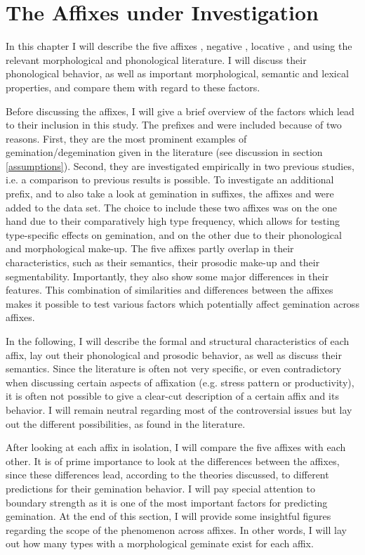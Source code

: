 
\chapter{The Affixes under Investigation}{\label{affixes}}


In this chapter I will describe the five affixes , negative , locative ,  and  using the relevant morphological and phonological literature. I will discuss their phonological behavior, as well as important morphological, semantic and lexical properties, and compare them with regard to these factors.

Before discussing the affixes, I will give a brief overview of the factors which lead to their inclusion in this study.
The prefixes  and  were included because of two reasons.
First, they are the most prominent examples of gemination/degemination given in the literature (see discussion in section \ref{assumptions}).  Second, they are investigated empirically in two previous studies, i.e. a comparison to previous results is possible. 
To investigate an additional prefix, and to also take a look at gemination in suffixes, the affixes  and   were added to the data set. The choice to include these two affixes was on the one hand due to their comparatively high type frequency, which allows for testing type-specific effects on gemination, and  on the other due to their phonological and morphological make-up.
The five affixes partly overlap in their characteristics, such as their semantics, their prosodic make-up and their segmentability. Importantly, they also show some major differences in their features. This combination of similarities and differences between the affixes makes it possible to test various factors which potentially affect gemination across affixes.

In the following, I will describe the formal and structural characteristics of each affix, lay out their phonological and prosodic behavior, as well as discuss their semantics. Since the literature is often not very specific, or even contradictory when discussing certain aspects of affixation (e.g. stress pattern or productivity), it is often not possible to give a clear-cut description of a certain affix and its behavior. I will remain neutral regarding most of the controversial issues but lay out the different possibilities, as found in the literature.  

After looking at each affix in isolation, I will compare the five affixes with each other. It is of prime importance to look at the differences between the affixes, since these differences lead, according to the theories discussed, to different predictions for their gemination behavior. I will pay special attention to boundary strength as it is one of the most important factors for predicting gemination.  
At the end of this section, I will provide some insightful figures regarding the scope of the phenomenon across affixes. In other words, I will lay out how many types with a morphological geminate exist for each affix.

